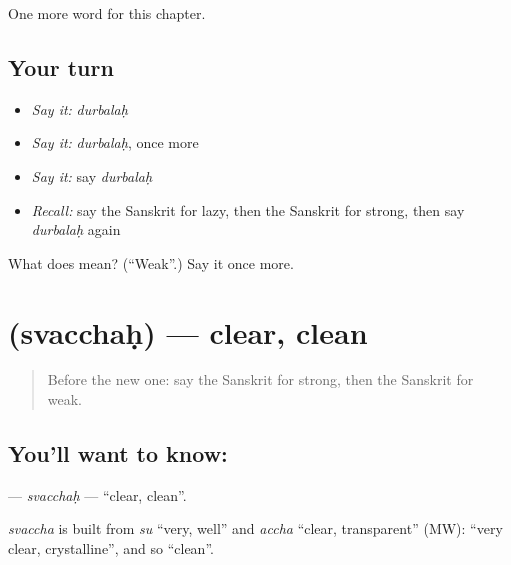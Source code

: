 \begin{grammarlens}[title={What you've built}]
One more word for this chapter.
\end{grammarlens}

\subsection*{Your turn}
\begin{itemize}
\raggedright
  \item \emph{Say it:} \emph{durbalaḥ}
  \item \emph{Say it:} \emph{durbalaḥ}, once more
  \item \emph{Say it:} say \emph{durbalaḥ}
  \item \emph{Recall:} say the Sanskrit for lazy, then the Sanskrit for strong, then say \emph{durbalaḥ} again
\end{itemize}

\begin{tcolorbox}[breakable,colback=teal!4,colframe=teal!35!black,title={Before you move on}]
What does  mean? (\textquotedblleft{}Weak\textquotedblright{}.) Say it once more.
\end{tcolorbox}
\section[\texorpdfstring{\sk{स्वच्छः} (svacchaḥ)}{स्वच्छः (svacchaḥ)}]{ (svacchaḥ) — clear, clean}

\label{lesson:SA-C130-svacchah}



\begin{quote}
Before the new one: say the Sanskrit for strong, then the Sanskrit for weak.
\end{quote}

\subsection*{You'll want to know: }
\textbf{} — \emph{svacchaḥ} — \textquotedblleft{}clear, clean\textquotedblright{}.

\begin{cousinweb}
\emph{svaccha} is built from \emph{su} \textquotedblleft{}very, well\textquotedblright{} and \emph{accha} \textquotedblleft{}clear, transparent\textquotedblright{} (MW): \textquotedblleft{}very clear, crystalline\textquotedblright{}, and so \textquotedblleft{}clean\textquotedblright{}.
\end{cousinweb}


